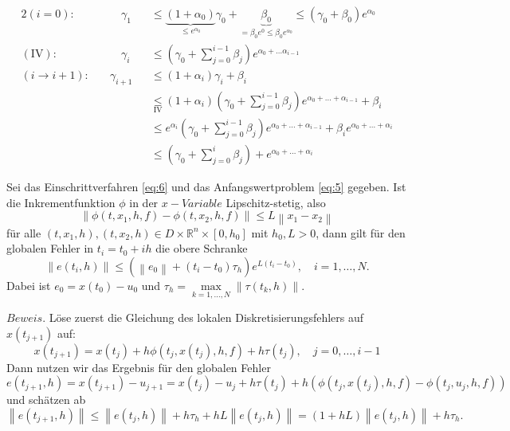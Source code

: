 \begin{alignat*}{2}
    (i=0):& \qquad \gamma_1 &&\leq
    \underbrace{(1 + \alpha_0)}_{\leq e^{\alpha_0}}\gamma_0 +
    \underbrace{\beta_0}_{=\beta_0 e^{0} \leq \beta_0 e^{\alpha_0}} \leq (\gamma_0 + \beta_0)e^{\alpha_0}\\
    (\text{IV}):& \qquad
    \gamma_{i} &&\leq \left( \gamma_0 + \sum_{j=0}^{i-1}\beta_j \right) e^{\alpha_0 + \dots \alpha_{i-1}} \\
    (i \rightarrow i+1):& \quad
    \gamma_{i+1} &&\leq (1 + \alpha_{i})\gamma_{i} + \beta_i\\
    & &&\underset{\text{IV}}{\leq} (1 + \alpha_i)
    \left( \gamma_0 + \sum_{j=0}^{i-1}\beta_j \right) e^{\alpha_0 + \dots + \alpha_{i-1}}+\beta_{i}\\
    &  &&\leq e^{\alpha_i} \left( \gamma_0 + \sum_{j=0}^{i-1}\beta_j \right) e^{\alpha_0 + \dots + \alpha_{i-1}}
    + \beta_i e^{\alpha_0 + \dots + \alpha_{i}}\\
    &  &&\leq \left( \gamma_0 +  \sum_{j=0}^{i}\beta_j \right) + e^{\alpha_0 + \dots + \alpha_{i}}
\end{alignat*}
\begin{satz}
    Sei das Einschrittverfahren \eqref{eq:6} und das Anfangswertproblem \eqref{eq:5} gegeben. Ist  die Inkrementfunktion
    $\phi$ in der $x-Variable$ Lipschitz-stetig, also
    \[
        \left\lVert \phi(t, x_1, h, f) - \phi(t, x_2, h, f) \right\rVert \leq L \left\lVert x_1 - x_2 \right\rVert
    \]
    für alle $(t, x_1, h),(t, x_2, h) \in D \times \mathbb{R}^n \times [0, h_0]$ mit $h_0, L>0$, dann gilt für den
    globalen Fehler in $t_i = t_0 + ih$ die obere Schranke
    \[
        \left\lVert e(t_i,h) \right\rVert \leq \left( \left\lVert e_0 \right\rVert + (t_i-t_0)\tau_h \right)
        e^{L(t_i-t_0)}, \quad i = 1, \dots, N.
    \]
    Dabei ist $e_0 = x(t_0)-u_0$ und $\tau_h= \max\limits_{k=1,\dots,N} \left\lVert \tau(t_k,h) \right\rVert $.
\end{satz}
$Beweis.$ Löse zuerst die Gleichung des lokalen Diskretisierungsfehlers auf $x(t_{j+1})$ auf:
\[
    x(t_{j+1}) = x(t_j) + h \phi(t_j, x(t_j),h,f) + h \tau(t_j), \quad j = 0, \dots , i-1
\]
Dann nutzen wir das Ergebnis für den globalen Fehler
\[
    e(t_{j+1},h) = x(t_{j+1}) - u_{j+1} = x(t_j) - u_j + h \tau(t_j)
    + h \left( \phi(t_j, x(t_j),h,f) - \phi(t_j, u_j, h, f) \right)
\]
und schätzen ab
\[
    \left\lVert e(t_{j+1},h) \right\rVert \leq \left\lVert e(t_j, h) \right\rVert + h\tau_h
    + hL\left\lVert e(t_j,h) \right\rVert = (1 + hL) \left\lVert e(t_j,h) \right\rVert + h\tau_h.
\]
